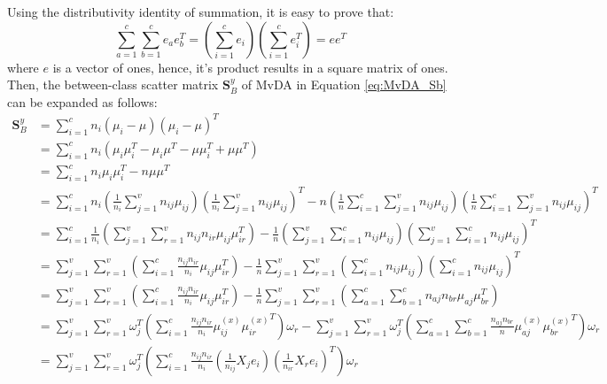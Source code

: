 \begin{appendix}
    Using the distributivity identity of summation, it is easy to prove that:
    \begin{equation}
        \sum_{a=1}^{c}\sum_{b=1}^{c}e_a e_b^T = \left(\sum_{i=1}^{c}e_i\right)\left(\sum_{i=1}^{c}e_i^T\right) = ee^T
    \end{equation}
    where $e$ is a vector of ones, hence, it's product results in a square matrix of ones.
    Then, the between-class scatter matrix $\boldsymbol{S}^y_B$ of MvDA in Equation \eqref{eq:MvDA_Sb} can be expanded as follows:
    \begin{equation}
        \begin{split}
            \boldsymbol{S}^y_B &= \sum_{i=1}^{c}n_i\left(\mu_i - \mu\right)\left(\mu_i - \mu\right)^T \\
            &= \sum_{i=1}^{c}n_i\left(\mu_i\mu_i^T - \mu_i\mu^T - \mu\mu_i^T + \mu\mu^T\right) \\
            &= \sum_{i=1}^{c}n_i\mu_i\mu_i^T - n\mu\mu^T \\
            &= \sum_{i=1}^{c}n_i\left(\frac{1}{n_i}\sum_{j=1}^{v}n_{ij}\mu_{ij}\right)\left(\frac{1}{n_i}\sum_{j=1}^{v}n_{ij}\mu_{ij}\right)^T - n\left(\frac{1}{n}\sum_{i=1}^{c}\sum_{j=1}^{v}n_{ij}\mu_{ij}\right)\left(\frac{1}{n}\sum_{i=1}^{c}\sum_{j=1}^{v}n_{ij}\mu_{ij}\right)^T \\
            &= \sum_{i=1}^{c}\frac{1}{n_i}\left(\sum_{j=1}^{v}\sum_{r=1}^{v}n_{ij}n_{ir}\mu_{ij}\mu_{ir}^T\right) - \frac{1}{n}\left(\sum_{j=1}^{v}\sum_{i=1}^{c}n_{ij}\mu_{ij}\right)\left(\sum_{j=1}^{v}\sum_{i=1}^{c}n_{ij}\mu_{ij}\right)^T \\
            &= \sum_{j=1}^{v}\sum_{r=1}^{v}\left(\sum_{i=1}^{c}\frac{n_{ij}n_{ir}}{n_i}\mu_{ij}\mu_{ir}^T\right) - \frac{1}{n}\sum_{j=1}^{v}\sum_{r=1}^{v}\left(\sum_{i=1}^{c}n_{ij}\mu_{ij}\right)\left(\sum_{i=1}^{c}n_{ij}\mu_{ij}\right)^T \\
            &= \sum_{j=1}^{v}\sum_{r=1}^{v}\left(\sum_{i=1}^{c}\frac{n_{ij}n_{ir}}{n_i}\mu_{ij}\mu_{ir}^T\right) - \frac{1}{n}\sum_{j=1}^{v}\sum_{r=1}^{v}\left(\sum_{a=1}^{c}\sum_{b=1}^{c}n_{aj}n_{br}\mu_{aj}\mu_{br}^T\right) \\
            &= \sum_{j=1}^{v}\sum_{r=1}^{v}\omega_j^T\left(\sum_{i=1}^{c}\frac{n_{ij}n_{ir}}{n_i}\mu^{(x)}_{ij}{\mu^{(x)}_{ir}}^T\right)\omega_r - \sum_{j=1}^{v}\sum_{r=1}^{v}\omega_j^T\left(\sum_{a=1}^{c}\sum_{b=1}^{c}\frac{n_{aj}n_{br}}{n}\mu^{(x)}_{aj}{\mu^{(x)}_{br}}^T\right)\omega_r \\
            &= \sum_{j=1}^{v}\sum_{r=1}^{v}\omega_j^T\left(\sum_{i=1}^{c}\frac{n_{ij}n_{ir}}{n_i}\left(\frac{1}{n_{ij}}X_j e_i\right)\left(\frac{1}{n_{ir}}X_r e_i\right)^T\right)\omega_r \\

\end{split}
\end{equation}
\end{appendix}
